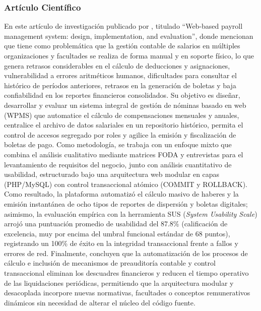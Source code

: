 \subsubsection{Artículo Científico}


En este artículo de investigación publicado por \textcite{ahmed2023web}, titulado ``Web-based payroll management system: design, implementation, and evaluation'', 
donde mencionan que tiene como problemática que la gestión contable de salarios en múltiples organizaciones y facultades se realiza de forma manual y en soporte físico, 
lo que genera retrasos considerables en el cálculo de deducciones y asignaciones, vulnerabilidad a errores aritméticos humanos, dificultades para consultar el histórico de períodos anteriores, 
retrasos en la generación de boletas y baja confiabilidad en los reportes financieros consolidados. 
Su objetivo es diseñar, desarrollar y evaluar un sistema integral de gestión de nóminas basado en web (WPMS) que automatice el cálculo de compensaciones mensuales y anuales, 
centralice el archivo de datos salariales en un repositorio histórico, permita el control de accesos segregado por roles y agilice la emisión y fiscalización de boletas de pago. 
Como metodología, se trabaja con un enfoque mixto que combina el análisis cualitativo mediante matrices FODA y entrevistas para el levantamiento de requisitos del negocio, 
junto con análisis cuantitativo de usabilidad, estructurado bajo una arquitectura web modular en capas (PHP/MySQL) con control transaccional atómico (COMMIT y ROLLBACK). 
Como resultado, la plataforma automatizó el cálculo masivo de haberes y la emisión instantánea de ocho tipos de reportes de dispersión y boletas digitales; asimismo, 
la evaluación empírica con la herramienta SUS (\textit{System Usability Scale}) arrojó una puntuación promedio de usabilidad del 87.8\% (calificación de excelencia, muy por encima del umbral funcional estándar de 68 puntos), 
registrando un 100\% de éxito en la integridad transaccional frente a fallos y errores de red. Finalmente, 
concluyen que la automatización de los procesos de cálculo e inclusión de mecanismos de preauditoría contable y control transaccional eliminan los descuadres financieros y 
reducen el tiempo operativo de las liquidaciones periódicas, permitiendo que la arquitectura modular y desacoplada incorpore nuevas normativas, 
facultades o conceptos remunerativos dinámicos sin necesidad de alterar el núcleo del código fuente.



